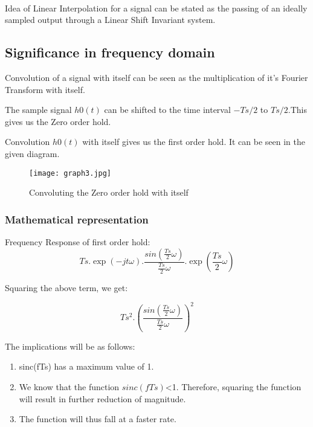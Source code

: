 \paragraph{}
Idea of Linear Interpolation for a signal can be stated as the passing of an ideally sampled output through a Linear Shift Invariant system.
\paragraph{}
\paragraph{}
\subsection{Significance in frequency domain}

Convolution of a signal with itself can be seen as the multiplication of it's Fourier Transform with itself. 

The sample signal $h0(t)$ can be shifted to the time interval $-Ts/2$ to $Ts/2$.This gives us the Zero order hold. 

Convolution $h0(t)$ with itself gives us the first order hold. It can be seen in the given diagram.
\begin{figure}[h]
\centering
\texttt{[image: graph3.jpg]}
\caption{Convoluting the Zero order hold with itself}
\end{figure}
\pagebreak

\subsubsection{Mathematical representation}

Frequency Response of first order hold:
$$Ts.\exp(-jt\omega).\frac{sin(\frac{Ts}{2}\omega)}{\frac{Ts}{2}\omega}.\exp(\frac{Ts}{2}\omega)$$

Squaring the above term, we get:

$$Ts^2.(\frac{sin(\frac{Ts}{2}\omega)}{\frac{Ts}{2}\omega})^2$$

The implications will be as follows:
\begin{enumerate}
\item sinc(fTs) has a maximum value of 1.
\item We know that the function $sinc(fTs)$<1. Therefore, squaring the function will result in further reduction of magnitude.
\item The function will thus fall at a faster rate.
\end{enumerate}


